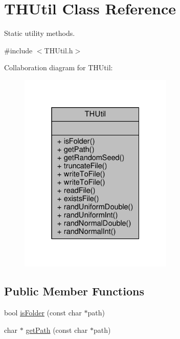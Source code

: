 \hypertarget{classTHUtil}{}\section{T\+H\+Util Class Reference}
\label{classTHUtil}


Static utility methods.  




{\ttfamily \#include $<$T\+H\+Util.\+h$>$}



Collaboration diagram for T\+H\+Util\+:
\nopagebreak
\begin{figure}[H]
\begin{center}
\leavevmode
\includegraphics[width=208pt]{classTHUtil__coll__graph}
\end{center}
\end{figure}
\subsection*{Public Member Functions}
\begin{DoxyCompactItemize}
\item 
bool \hyperlink{classTHUtil_ac405438e0d0867945b98b32226c2a5eb}{is\+Folder} (const char $\ast$path)
\item 
char $\ast$ \hyperlink{classTHUtil_a5d4a93f3529c11ee522743dba7ac4bca}{get\+Path} (const char $\ast$path)
\end{DoxyCompactItemize}
